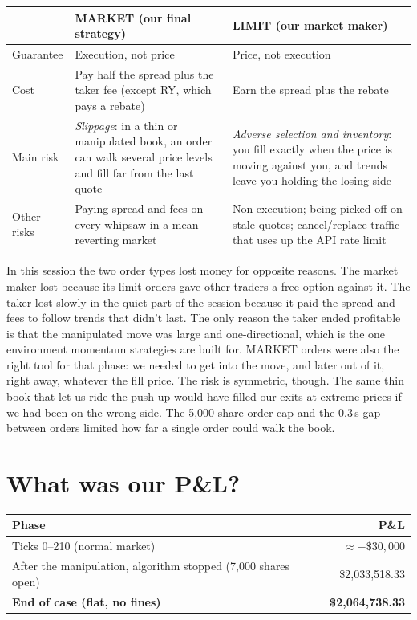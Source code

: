 \documentclass[11pt]{article}
\begin{document}
\begin{table}[H]
\centering
\small
\begin{tabular}{@{}p{2.4cm}p{6.1cm}p{6.1cm}@{}}
\toprule
 & \textbf{MARKET (our final strategy)} & \textbf{LIMIT (our market maker)} \\
\midrule
Guarantee & Execution, not price & Price, not execution \\
Cost & Pay half the spread plus the taker fee (except RY, which pays a rebate) & Earn the spread plus the rebate \\
Main risk & \emph{Slippage}: in a thin or manipulated book, an order can walk
            several price levels and fill far from the last quote &
            \emph{Adverse selection and inventory}: you fill exactly when the price
            is moving against you, and trends leave you holding the losing side \\
Other risks & Paying spread and fees on every whipsaw in a mean-reverting market &
              Non-execution; being picked off on stale quotes; cancel/replace
              traffic that uses up the API rate limit \\
\bottomrule
\end{tabular}
\end{table}

In this session the two order types lost money for opposite reasons. The market
maker lost because its limit orders gave other traders a free option against it.
The taker lost slowly in the quiet part of the session because it paid the spread
and fees to follow trends that didn't last. The only reason the taker ended
profitable is that the manipulated move was large and one-directional, which is
the one environment momentum strategies are built for. MARKET orders were also the
right tool for that phase: we needed to get into the move, and later out of it,
right away, whatever the fill price. The risk is symmetric, though. The same thin
book that let us ride the push up would have filled our exits at extreme prices if
we had been on the wrong side. The 5,000-share order cap and the 0.3\,s gap between
orders limited how far a single order could walk the book.

\section{What was our P\&L?}

\begin{table}[H]
\centering
\begin{tabular}{@{}lr@{}}
\toprule
Phase & P\&L \\
\midrule
Ticks 0--210 (normal market) & $\approx -\$30{,}000$ \\
After the manipulation, algorithm stopped (7,000 shares open) & \$2{,}033{,}518.33 \\
\textbf{End of case (flat, no fines)} & \textbf{\$2{,}064{,}738.33} \\
\bottomrule
\end{tabular}
\end{table}
\end{document}
